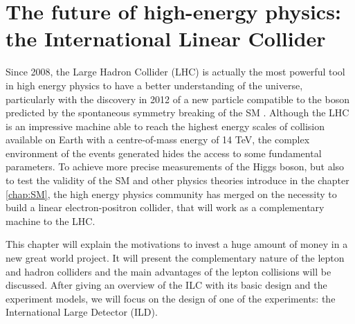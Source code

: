 \chapter{The future of high-energy physics: the International Linear Collider}
\label{chap:ILC}


  Since 2008, the Large Hadron Collider (LHC) is actually the most powerful tool in high energy physics to have a better understanding of the universe, particularly with the discovery in 2012 of a new particle compatible to the boson predicted by the spontaneous symmetry breaking of the SM \cite{Aad2012, Chatrchyan2012}.
  Although the LHC is an impressive machine able to reach the highest energy scales of collision available on Earth with a centre-of-mass energy of 14 TeV, the complex environment of the events generated hides the access to some fundamental parameters. 
  To achieve more precise measurements of the Higgs boson, but also to test the validity of the SM and other physics theories introduce in the chapter \ref{chap:SM}, the high energy physics community has merged on the necessity to build a linear electron-positron collider, that will work as a complementary machine to the LHC.
  
  This chapter will explain the motivations to invest a huge amount of money in a new great world project. It will present the complementary nature of the lepton and hadron colliders and the main advantages of the lepton collisions will be discussed.
  After giving an overview of the ILC with its basic design and the experiment models, we will focus on the design of one of the experiments: the International Large Detector (ILD).

 \minitoc
  

